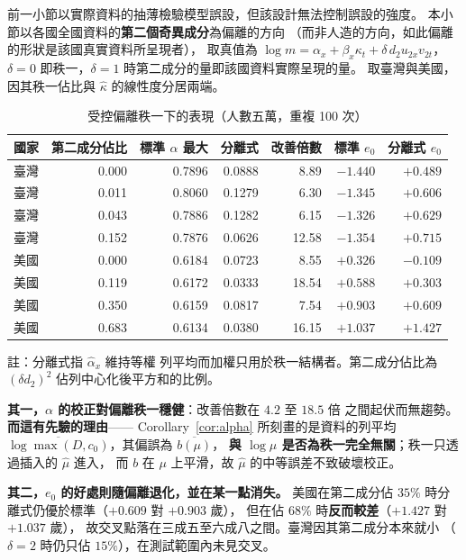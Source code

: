 \documentclass[UTF8, fontset=macnew, a4paper, 12pt]{ctexart}
\begin{document}
前一小節以實際資料的抽薄檢驗模型誤設，但該設計無法控制誤設的強度。
本小節以各國全國資料的\textbf{第二個奇異成分}為偏離的方向
（而非人造的方向，如此偏離的形狀是該國真實資料所呈現者），
取真值為 $\log m=\alpha_x+\beta_x\kappa_t+\delta\,d_2u_{2x}v_{2t}$，
$\delta=0$ 即秩一，$\delta=1$ 時第二成分的量即該國資料實際呈現的量。
取臺灣與美國，因其秩一佔比與 $\hat\kappa$ 的線性度分居兩端。

\begin{table}[H]
\centering
\caption{受控偏離秩一下的表現（人數五萬，重複 100 次）}
\small
\renewcommand{\arraystretch}{1.1}
\begin{tabular}{lrrrrrr}
\toprule
國家 & 第二成分佔比 & 標準 $\alpha$ 最大 & 分離式 & 改善倍數 & 標準 $e_0$ & 分離式 $e_0$\\
\midrule
臺灣 & 0.000 & 0.7896 & 0.0888 & 8.89 & $-1.440$ & $+0.489$\\
臺灣 & 0.011 & 0.8060 & 0.1279 & 6.30 & $-1.345$ & $+0.606$\\
臺灣 & 0.043 & 0.7886 & 0.1282 & 6.15 & $-1.326$ & $+0.629$\\
臺灣 & 0.152 & 0.7876 & 0.0626 & 12.58 & $-1.354$ & $+0.715$\\
美國 & 0.000 & 0.6184 & 0.0723 & 8.55 & $+0.326$ & $-0.109$\\
美國 & 0.119 & 0.6172 & 0.0333 & 18.54 & $+0.588$ & $+0.303$\\
美國 & 0.350 & 0.6159 & 0.0817 & 7.54 & $+0.903$ & $+0.609$\\
美國 & 0.683 & 0.6134 & 0.0380 & 16.15 & $\mathbf{+1.037}$ & $\mathbf{+1.427}$\\
\bottomrule
\end{tabular}

\vspace{2pt}
\parbox{0.92\textwidth}{\footnotesize 註：分離式指 $\hat\alpha_x$ 維持等權
列平均而加權只用於秩一結構者。第二成分佔比為
$(\delta d_2)^2$ 佔列中心化後平方和的比例。}
\label{tab:rank2}
\end{table}

\textbf{其一，$\alpha$ 的校正對偏離秩一穩健}：改善倍數在 $4.2$ 至 $18.5$ 倍
之間起伏而無趨勢。\textbf{而這有先驗的理由}——
Corollary~\ref{cor:alpha} 所刻畫的是資料的列平均
$\overline{\log\max(D,c_0)}$，其偏誤為 $\overline{b(\mu)}$，
\textbf{與 $\log\mu$ 是否為秩一完全無關}；秩一只透過插入的 $\hat\mu$ 進入，
而 $b$ 在 $\mu$ 上平滑，故 $\hat\mu$ 的中等誤差不致破壞校正。

\textbf{其二，$e_0$ 的好處則隨偏離退化，並在某一點消失。}
美國在第二成分佔 $35\%$ 時分離式仍優於標準（$+0.609$ 對 $+0.903$ 歲），
但在佔 $68\%$ 時\textbf{反而較差}（$+1.427$ 對 $+1.037$ 歲），
故交叉點落在三成五至六成八之間。臺灣因其第二成分本來就小
（$\delta=2$ 時仍只佔 $15\%$），在測試範圍內未見交叉。
\end{document}
